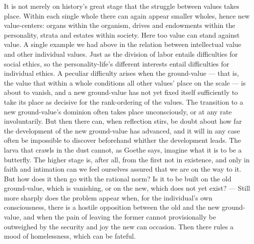 \documentclass[12pt]{book}
\newcommand{\opage}[1]{\marginnote{\footnotesize\textit{[#1]}}}
\begin{document}
It is not merely on history's great stage that the struggle between values takes place. Within each single whole there
can again appear smaller wholes, hence new value-centers: organs within the organism, drives and endowments within the
personality, strata and estates within society. Here too value can stand against value. A single example we had above in
the relation between intellectual value and other individual values. Just as the division of labor entails
difficulties for social ethics, so the personality-life's different interests entail difficulties for individual ethics.
A peculiar difficulty arises when the ground-value --- that is, the value that within a whole conditions all other
values' place on the scale --- is about to vanish, and a new ground-value has not yet fixed itself sufficiently to take
its place as decisive for the rank-ordering of the values. The transition to a new ground-value's dominion often takes
place unconsciously, or at any rate involuntarily. But then there can, when reflection stirs, be doubt about how far the
development of the new ground-value has advanced, and it will in any case often be impossible to discover beforehand
whither the development leads. The larva that crawls in the dust cannot, as Goethe says, imagine what it is to be a
butterfly. The higher stage is, after all, from the first not in existence, and only in faith and intimation can we feel
ourselves assured that we are on the way to it. But how does it then go with the rational norm? Is it to be built on the
old ground-value, which is vanishing, or on the new, which does not yet exist? --- Still more sharply does the problem
appear when, for the individual's own consciousness, there is a hostile opposition \opage{79}between the old and the new
ground-value, and when the pain of leaving the former cannot provisionally be outweighed by the security and joy the new
can occasion. Then there rules a mood of homelessness, which can be fateful.
\end{document}
